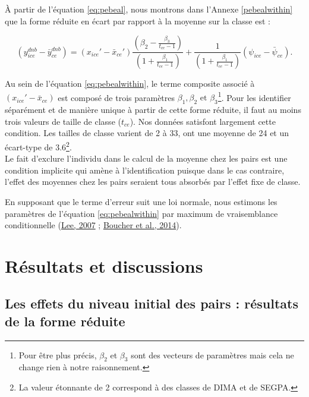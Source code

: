 \documentclass[
]{book}
\begin{document}
À partir de l'équation \eqref{eq:pebeal}, nous montrons dans l'Annexe \ref{pebealwithin} que la forme réduite en écart par rapport à la moyenne sur la classe est :

\begin{equation}
\label{eq:pebealwithin}
(y_{ice}^{dnb} - \bar{y}^{dnb}_{ce}) = (x_{ice}' - \bar{x}_{ce}') \frac{(\beta_2 - \frac{\beta_3}{t_{ce} - 1})}{(1 + \frac{\beta_1}{t_{ce} - 1})} + \frac{1}{(1 + \frac{\beta_1}{t_{ce} - 1})} (\psi_{ice} - \bar{\psi}_{ce}).
\end{equation}

Au sein de l'équation \eqref{eq:pebealwithin}, le terme composite associé à \((x_{ice}' - \bar{x}_{ce})\) est composé de trois paramètres \(\beta_1, \beta_2 \text{ et } \beta_3\)\footnote{Pour être plus précis, \(\beta_2\) et \(\beta_3\) sont des vecteurs de paramètres mais cela ne change rien à notre raisonnement.}. Pour les identifier séparément et de manière unique à partir de cette forme réduite, il faut au moins trois valeurs de taille de classe (\(t_{ce}\)). Nos données satisfont largement cette condition. Les tailles de classe varient de 2 à 33, ont une moyenne de 24 et un écart-type de 3.6\footnote{La valeur étonnante de 2 correspond à des classes de DIMA et de SEGPA.}.\\
\quad Le fait d'exclure l'individu dans le calcul de la moyenne chez les pairs est une condition implicite qui amène à l'identification puisque dans le cas contraire, l'effet des moyennes chez les pairs seraient tous absorbés par l'effet fixe de classe.

\quad En supposant que le terme d'erreur suit une loi normale, nous estimons les paramètres de l'équation \eqref{eq:pebealwithin} par maximum de vraisemblance conditionnelle (\protect\hyperlink{ref-LEE:07}{Lee, 2007} ; \protect\hyperlink{ref-BOU:eal:14}{Boucher et al., 2014}).

\hypertarget{peres}{%
\section{Résultats et discussions}\label{peres}}

\hypertarget{peresfr}{%
\subsection{Les effets du niveau initial des pairs : résultats de la forme réduite}\label{peresfr}}
\end{document}
